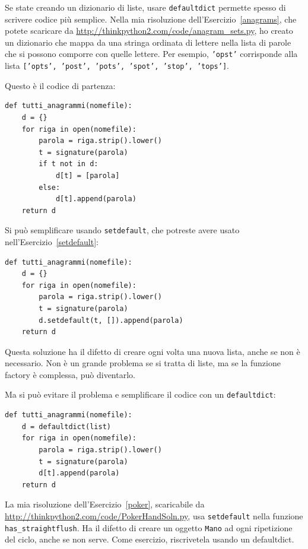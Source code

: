 \documentclass[10pt]{book}
\begin{document}
Se state creando un dizionario di liste, usare {\tt defaultdict} permette spesso di scrivere codice più semplice. Nella mia risoluzione dell'Esercizio~\ref{anagrams}, che potete scaricare da
\url{http://thinkpython2.com/code/anagram_sets.py}, ho creato un dizionario che mappa da una stringa ordinata di lettere nella lista di parole che si possono comporre con quelle lettere. Per esempio, {\tt 'opst'} corrisponde alla lista {\tt ['opts', 'post', 'pots', 'spot', 'stop', 'tops']}.

Questo è il codice di partenza:

\begin{verbatim}
def tutti_anagrammi(nomefile):
    d = {}
    for riga in open(nomefile):
        parola = riga.strip().lower()
        t = signature(parola)
        if t not in d:
            d[t] = [parola]
        else:
            d[t].append(parola)
    return d
\end{verbatim}

Si può semplificare usando {\tt setdefault}, che potreste avere usato nell'Esercizio~\ref{setdefault}:

\begin{verbatim}
def tutti_anagrammi(nomefile):
    d = {}
    for riga in open(nomefile):
        parola = riga.strip().lower()
        t = signature(parola)
        d.setdefault(t, []).append(parola)
    return d
\end{verbatim}

Questa soluzione ha il difetto di creare ogni volta una nuova lista, anche se non è necessario. Non è un grande problema se si tratta di liste, ma se la funzione factory è complessa, può diventarlo.

Ma si può evitare il problema e semplificare il codice con un {\tt defaultdict}:

\begin{verbatim}
def tutti_anagrammi(nomefile):
    d = defaultdict(list)
    for riga in open(nomefile):
        parola = riga.strip().lower()
        t = signature(parola)
        d[t].append(parola)
    return d
\end{verbatim}

La mia risoluzione dell'Esercizio~\ref{poker}, scaricabile da
\url{http://thinkpython2.com/code/PokerHandSoln.py},
usa {\tt setdefault} nella funzione
\verb"has_straightflush".  Ha il difetto di creare un oggetto {\tt Mano} ad ogni ripetizione del ciclo, anche se non serve. Come esercizio, riscrivetela usando un defaultdict.
\end{document}
